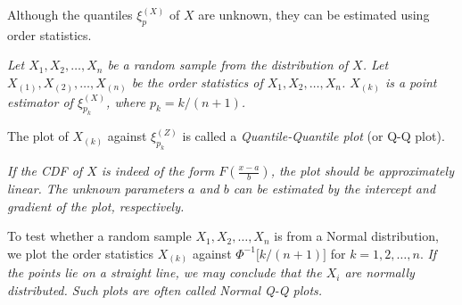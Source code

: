 
Although the quantiles $\xi_p^{(X)}$ of $X$ are unknown, they can be estimated using order statistics.

\vspace*{1ex}
\bit
\it Let $X_1,X_2,\ldots,X_n$ be a random sample from the distribution of $X$.
\it Let $X_{(1)},X_{(2)},\ldots,X_{(n)}$ be the order statistics of $X_1,X_2,\ldots,X_n$.
\it $X_{(k)}$ is a point estimator of $\xi_{p_k}^{(X)}$, where $p_k=k/(n+1)$.
\eit

\vspace*{3ex}
The plot of $X_{(k)}$ against $\xi_{p_k}^{(Z)}$ is called a \emph{Quantile-Quantile plot} (or Q-Q plot).

\vspace*{2ex}
\bit
\it If the CDF of $X$ is indeed of the form $\displaystyle F\left(\frac{x-a}{b}\right)$, the plot should be approximately linear.
\it The unknown parameters $a$ and $b$ can be estimated by the intercept and gradient of the plot, respectively.
\eit



\begin{example}
To test whether a random sample $X_1,X_2,\ldots,X_n$ is from a Normal distribution, we plot the order statistics $X_{(k)}$ against $\Phi^{-1}\big[k/(n+1)\big]$ for $k=1,2,\ldots,n$. 
\bit
\it If the points lie on a straight line, we may conclude that the $X_i$ are normally distributed. %
\it Such plots are often called \emph{Normal Q-Q plots}.
\eit
\begin{minipage}{\linewidth}
\begin{minipage}{0.45\linewidth}
\end{minipage}
\hfill
\begin{minipage}{0.45\linewidth}
\end{minipage}
\end{minipage}
\end{example} 


